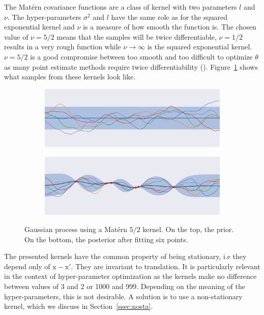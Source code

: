 The Matérn covariance functions are a class of kernel with two parameters $l$ and $\nu$. The hyper-parameters $\sigma^2$ and $l$ have the same role as for the squared exponential kernel and $\nu$ is a measure of how smooth the function is. The chosen value of $\nu = 5/2$ means that the samples will be twice differentiable, $\nu = 1/2$ results in a very rough function while $\nu \to \infty$ is the squared exponential kernel. $\nu = 5/2$ is a good compromise between too smooth and too difficult to optimize $\theta$ as many point estimate methods require twice differentiability (\textcite{snoek2012NIPS}). Figure~\ref{fig:gp_matern} shows what samples from these kernels look like.

\begin{figure}[htb]
    \centering
    \begin{subfigure}[b]{\textwidth}
        \includegraphics[width=\textwidth]{img_hyperopt/gp_matern_prior}
    \end{subfigure}

    \begin{subfigure}[b]{\textwidth}
        \includegraphics[width=\textwidth]{img_hyperopt/gp_matern_posterior}
    \end{subfigure}
    \caption{Gaussian process using a Matérn $5/2$ kernel. On the top, the prior. On the bottom, the posterior after fitting six points.}
    \label{fig:gp_matern}
\end{figure}

The presented kernels have the common property of being stationary, i.e they depend only of $\mathrm{x} - \mathrm{x'}$. They are invariant to translation. It is particularly relevant in the context of hyper-parameter optimization as the kernels make no difference between values of 3 and 2 or 1000 and 999. Depending on the meaning of the hyper-parameters, this is not desirable. A solution is to use a non-stationary kernel, which we discuss in Section~\ref{ssec:nosta}.

